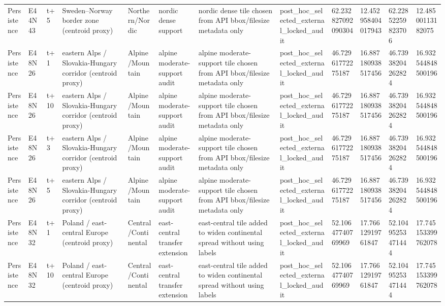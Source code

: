 \begin{landscape}
\begin{longtable}{llllllllllll}
Persistence & E44N43 & t+5 & Sweden–Norway border zone (centroid proxy) & Northern/Nordic & nordic dense support & nordic dense tile chosen from API bbox/filesize metadata only & post\_hoc\_selected\_external\_locked\_audit & 62.232827092090304 & 12.452958404017943 & 62.22852259823706 & 12.48500113182075 \\
Persistence & E48N26 & t+1 & eastern Alps / Slovakia-Hungary corridor (centroid proxy) & Alpine/Mountain & alpine moderate-support audit & alpine moderate-support tile chosen from API bbox/filesize metadata only & post\_hoc\_selected\_external\_locked\_audit & 46.72961772275187 & 16.887180938517456 & 46.73938204262824 & 16.932544848500196 \\
Persistence & E48N26 & t+10 & eastern Alps / Slovakia-Hungary corridor (centroid proxy) & Alpine/Mountain & alpine moderate-support audit & alpine moderate-support tile chosen from API bbox/filesize metadata only & post\_hoc\_selected\_external\_locked\_audit & 46.72961772275187 & 16.887180938517456 & 46.73938204262824 & 16.932544848500196 \\
Persistence & E48N26 & t+3 & eastern Alps / Slovakia-Hungary corridor (centroid proxy) & Alpine/Mountain & alpine moderate-support audit & alpine moderate-support tile chosen from API bbox/filesize metadata only & post\_hoc\_selected\_external\_locked\_audit & 46.72961772275187 & 16.887180938517456 & 46.73938204262824 & 16.932544848500196 \\
Persistence & E48N26 & t+5 & eastern Alps / Slovakia-Hungary corridor (centroid proxy) & Alpine/Mountain & alpine moderate-support audit & alpine moderate-support tile chosen from API bbox/filesize metadata only & post\_hoc\_selected\_external\_locked\_audit & 46.72961772275187 & 16.887180938517456 & 46.73938204262824 & 16.932544848500196 \\
Persistence & E48N32 & t+1 & Poland / east-central Europe (centroid proxy) & Central/Continental & east-central transfer extension & east-central tile added to widen continental spread without using labels & post\_hoc\_selected\_external\_locked\_audit & 52.10647740769969 & 17.76612919761847 & 52.10495253471444 & 17.745153399762078 \\
Persistence & E48N32 & t+10 & Poland / east-central Europe (centroid proxy) & Central/Continental & east-central transfer extension & east-central tile added to widen continental spread without using labels & post\_hoc\_selected\_external\_locked\_audit & 52.10647740769969 & 17.76612919761847 & 52.10495253471444 & 17.745153399762078 \\

\end{longtable}
\end{landscape}

